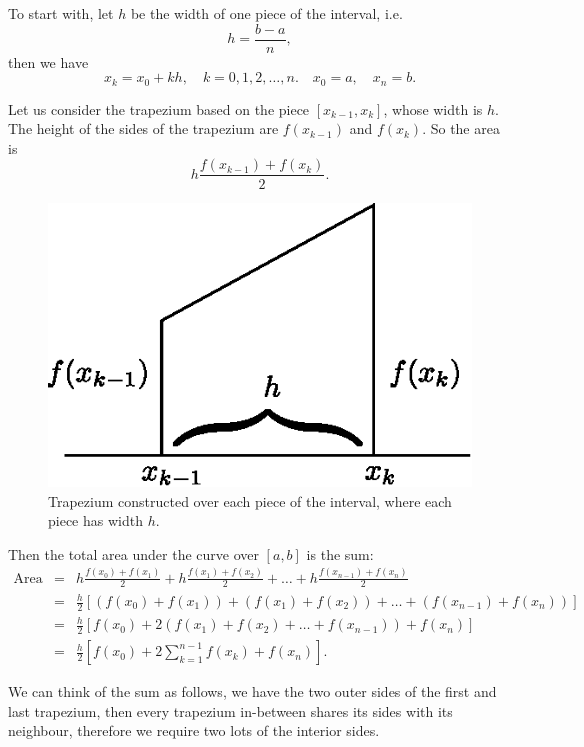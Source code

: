 To start with, let $h$ be the width of one piece of the interval, i.e.
\[h=\frac{b-a}{n},\]
then we have
\[x_k=x_0+kh,\quad k=0,1,2,\dots,n.\quad x_0=a,\quad x_n=b.\]

Let us consider the trapezium based on the piece $[x_{k-1},x_k]$, whose width is $h$. The height of the sides of the trapezium are $f(x_{k-1})$ and $f(x_k)$. So the area is
\[h\frac{f(x_{k-1})+ f(x_k)}{2}.\]

\begin{figure}[H]
\centering
\includegraphics[scale=0.7]{img/one-trapezium}
\captionstyle{\centering\it}
\caption{Trapezium constructed over each piece of the interval, where each piece has width $h$.}
\label{fig:one-trapezium}
\end{figure}

Then the total area under the curve over $[a,b]$ is the sum:
\begin{eqnarray*}
\text{Area}&=&h\frac{f(x_{0})+ f(x_1)}{2}+h\frac{f(x_{1})+ f(x_2)}{2}+\dots+h\frac{f(x_{n-1})+ f(x_n)}{2} \\
&=&\frac{h}{2}\left[(f(x_0)+f(x_1))+(f(x_1)+f(x_2))+\dots+(f(x_{n-1})+f(x_n))\right] \\
&=& \frac{h}{2}\left[f(x_0)+2(f(x_1)+f(x_2)+\dots+f(x_{n-1}))+f(x_n)\right] \\
&=&\frac{h}{2}\left[f(x_0)+2\sum_{k=1}^{n-1}f(x_k) +f(x_n)\right].
\end{eqnarray*}

We can think of the sum as follows, we have the two outer sides of the first and last trapezium, then every trapezium in-between shares its sides with its neighbour, therefore we require two lots of the interior sides.

